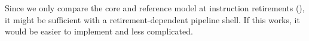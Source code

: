 

Since we only compare the core and reference model at instruction retirements (), it might be sufficient with a retirement-dependent pipeline shell. If this works, it would be easier to implement and less complicated. 

